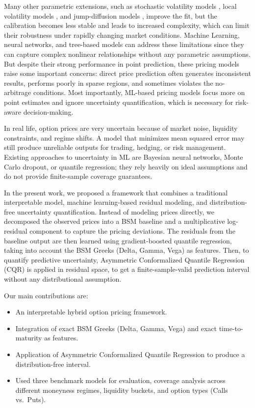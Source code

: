 \documentclass[runningheads]{llncs}
\newcommand{\rev}[1]{{\color{blue}#1}}
\begin{document}
\rev{Many other parametric extensions, such as stochastic volatility models \cite{heston1993closed}, local volatility models \cite{dupire1994pricing}, and jump-diffusion models \cite{bates1996jumps}, improve the fit, but the calibration becomes less stable and leads to increased complexity, which can limit their robustness under rapidly changing market conditions.}
Machine Learning, neural networks, and tree-based models can address these limitations since they can capture complex nonlinear relationships without any parametric assumptions\cite{vovk2005algorithmic,angelopoulos2021gentle}. But despite their strong performance in point prediction, these pricing models raise some important concerns: direct price prediction often generates inconsistent results, performs poorly in sparse regions, and sometimes violates the no-arbitrage conditions. Most importantly, ML-based pricing models focus more on point estimates and ignore uncertainty quantification, which is necessary for risk-aware decision-making.

In real life, option prices are very uncertain because of market noise, liquidity constraints, and regime shifts. A model that minimizes mean squared error may still produce unreliable outputs for trading, hedging, or risk management. Existing approaches to uncertainty in ML are Bayesian neural networks, Monte Carlo dropout, or quantile regression; they rely heavily on ideal assumptions and do not provide finite-sample coverage guarantees.

In the present work,  we proposed a framework that combines a traditional interpretable model, machine learning-based residual modeling, and distribution-free uncertainty quantification. Instead of modeling prices directly, we decomposed the observed prices into a BSM baseline and a multiplicative log-residual component to capture the pricing deviations. \rev{The residuals from the baseline output are then learned using gradient-boosted quantile regression, taking into account the BSM Greeks (Delta, Gamma, Vega) as features. Then, to quantify predictive uncertainty, Asymmetric Conformalized Quantile Regression (CQR) \cite{romano2019conformalized} is applied in residual space, to get a finite-sample-valid prediction interval without any distributional assumption.}

Our main contributions are:
\begin{itemize}
    \item An interpretable hybrid option pricing framework.
    \item \rev{Integration of exact BSM Greeks (Delta, Gamma, Vega) and exact time-to-maturity as features.}
    \item \rev{Application of Asymmetric Conformalized Quantile Regression to produce a distribution-free interval.}
    \item \rev{Used three benchmark models for evaluation, coverage analysis across different moneyness regimes, liquidity buckets, and option types (Calls vs.\ Puts).}
\end{itemize}
\end{document}
